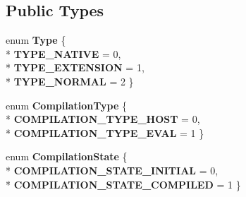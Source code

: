 \subsection*{Public Types}
\begin{DoxyCompactItemize}
\item 
enum {\bfseries Type} \{ \\*
{\bfseries T\+Y\+P\+E\+\_\+\+N\+A\+T\+I\+VE} = 0, 
\\*
{\bfseries T\+Y\+P\+E\+\_\+\+E\+X\+T\+E\+N\+S\+I\+ON} = 1, 
\\*
{\bfseries T\+Y\+P\+E\+\_\+\+N\+O\+R\+M\+AL} = 2
 \}\hypertarget{classv8_1_1internal_1_1_script_ab293a016cf807eed21d94c4eb8b5d3a4}{}\label{classv8_1_1internal_1_1_script_ab293a016cf807eed21d94c4eb8b5d3a4}

\item 
enum {\bfseries Compilation\+Type} \{ \\*
{\bfseries C\+O\+M\+P\+I\+L\+A\+T\+I\+O\+N\+\_\+\+T\+Y\+P\+E\+\_\+\+H\+O\+ST} = 0, 
\\*
{\bfseries C\+O\+M\+P\+I\+L\+A\+T\+I\+O\+N\+\_\+\+T\+Y\+P\+E\+\_\+\+E\+V\+AL} = 1
 \}\hypertarget{classv8_1_1internal_1_1_script_ad5ba2ef0105d489f8e29013ad262f584}{}\label{classv8_1_1internal_1_1_script_ad5ba2ef0105d489f8e29013ad262f584}

\item 
enum {\bfseries Compilation\+State} \{ \\*
{\bfseries C\+O\+M\+P\+I\+L\+A\+T\+I\+O\+N\+\_\+\+S\+T\+A\+T\+E\+\_\+\+I\+N\+I\+T\+I\+AL} = 0, 
\\*
{\bfseries C\+O\+M\+P\+I\+L\+A\+T\+I\+O\+N\+\_\+\+S\+T\+A\+T\+E\+\_\+\+C\+O\+M\+P\+I\+L\+ED} = 1
 \}\hypertarget{classv8_1_1internal_1_1_script_a365b68632fc01a8bbae09764f6a0c2d5}{}\label{classv8_1_1internal_1_1_script_a365b68632fc01a8bbae09764f6a0c2d5}

\end{DoxyCompactItemize}
